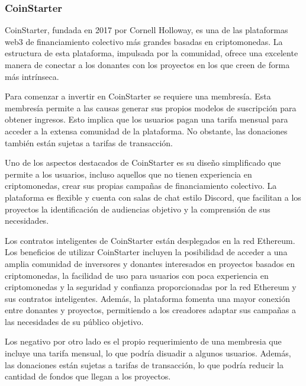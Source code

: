 \newpage

\subsubsection{CoinStarter}

CoinStarter\cite{singh2021introduction}, fundada en 2017 por Cornell Holloway, es una de las plataformas web3 de financiamiento colectivo más grandes basadas en criptomonedas. La estructura de esta plataforma, impulsada por la comunidad, ofrece una excelente manera de conectar a los donantes con los proyectos en los que creen de forma más intrínseca.

\bigskip

Para comenzar a invertir en CoinStarter se requiere una membresía. Esta membresía permite a las causas generar sus propios modelos de suscripción para obtener ingresos. Esto implica que los usuarios pagan una tarifa mensual para acceder a la extensa comunidad de la plataforma. No obstante, las donaciones también están sujetas a tarifas de transacción.

\bigskip

Uno de los aspectos destacados de CoinStarter es su diseño simplificado que permite a los usuarios, incluso aquellos que no tienen experiencia en criptomonedas, crear sus propias campañas de financiamiento colectivo. La plataforma es flexible y cuenta con salas de chat estilo Discord, que facilitan a los proyectos la identificación de audiencias objetivo y la comprensión de sus necesidades.

\bigskip

Los contratos inteligentes de CoinStarter están desplegados en la red Ethereum.
Los beneficios de utilizar CoinStarter incluyen la posibilidad de acceder a una amplia comunidad de inversores y donantes interesados en proyectos basados en criptomonedas, la facilidad de uso para usuarios con poca experiencia en criptomonedas y la seguridad y confianza proporcionadas por la red Ethereum y sus contratos inteligentes. Además, la plataforma fomenta una mayor conexión entre donantes y proyectos, permitiendo a los creadores adaptar sus campañas a las necesidades de su público objetivo.

\bigskip

Los negativo por otro lado es el propio requerimiento de una membresia que incluye una tarifa mensual, lo que podría disuadir a algunos usuarios. Además, las donaciones están sujetas a tarifas de transacción, lo que podría reducir la cantidad de fondos que llegan a los proyectos.

